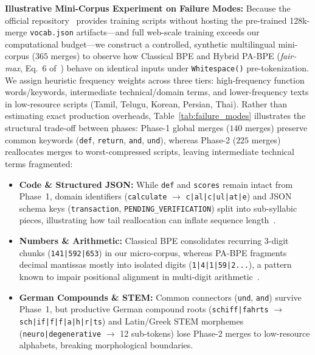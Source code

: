 \textbf{Illustrative Mini-Corpus Experiment on Failure Modes:} Because the official repository~\cite{foroutan2026parity} provides training scripts without hosting the pre-trained 128k-merge \texttt{vocab.json} artifacts---and full web-scale training exceeds our computational budget---we construct a controlled, synthetic multilingual mini-corpus ($365$ merges) to observe how Classical BPE and Hybrid PA-BPE (\textit{fair-max}, Eq.~6 of~\cite{foroutan2026parity}) behave on identical inputs under \texttt{Whitespace()} pre-tokenization. We assign heuristic frequency weights across three tiers: high-frequency function words/keywords, intermediate technical/domain terms, and lower-frequency texts in low-resource scripts (Tamil, Telugu, Korean, Persian, Thai). Rather than estimating exact production overheads, Table~\ref{tab:failure_modes} illustrates the structural trade-off between phases: Phase-1 global merges ($140$ merges) preserve common keywords (\texttt{def}, \texttt{return}, \texttt{and}, \texttt{und}), whereas Phase-2 ($225$ merges) reallocates merges to worst-compressed scripts, leaving intermediate technical terms fragmented:
\begin{itemize}
    \item \textbf{Code \& Structured JSON:} While \texttt{def} and \texttt{scores} remain intact from Phase~1, domain identifiers (\texttt{calculate} $\rightarrow$ \texttt{c|al|c|ul|at|e}) and JSON schema keys (\texttt{transaction}, \texttt{PENDING\_VERIFICATION}) split into sub-syllabic pieces, illustrating how tail reallocation can inflate sequence length~\cite{petrov2023language,ahia2023all}.
    \item \textbf{Numbers \& Arithmetic:} Classical BPE consolidates recurring 3-digit chunks (\texttt{141|592|653}) in our micro-corpus, whereas PA-BPE fragments decimal mantissas mostly into isolated digits (\texttt{1|4|1|59|2...}), a pattern known to impair positional alignment in multi-digit arithmetic~\cite{singh2024tokenization}.
    \item \textbf{German Compounds \& STEM:} Common connectors (\texttt{und}, \texttt{and}) survive Phase~1, but productive German compound roots (\texttt{schiff|fahrts} $\rightarrow$ \texttt{sch|if|f|f|a|h|r|ts}) and Latin/Greek STEM morphemes (\texttt{neuro|degenerative} $\rightarrow$ 12 sub-tokens) lose Phase-2 merges to low-resource alphabets, breaking morphological boundaries.
\end{itemize}
